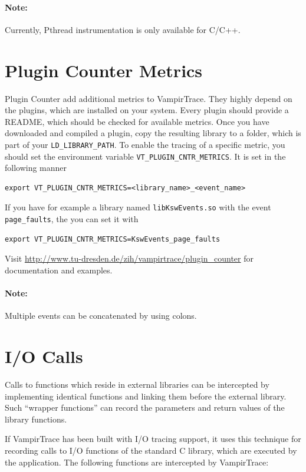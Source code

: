 \documentclass[a4paper,twoside,12pt,BCOR12mm]{scrbook}
\begin{document}
\paragraph{Note:} Currently, Pthread instrumentation is only available for C/C++.

\section{Plugin Counter Metrics}
\label{sec:plugin_counter_metrics}
  Plugin Counter add additional metrics to VampirTrace. They highly depend on
  the plugins, which are installed on your system. Every plugin should provide a
  README, which should be checked for available metrics.
  Once you have downloaded and compiled a plugin, copy the resulting library to
  a folder, which is part of your \texttt{LD\_LIBRARY\_PATH}.
  To enable the tracing of a specific metric, you should set the environment
  variable \texttt{VT\_PLUGIN\_CNTR\_METRICS}. It is set in the following manner
\begin{verbatim}
export VT_PLUGIN_CNTR_METRICS=<library_name>_<event_name>
\end{verbatim}
  If you have for example a library named \texttt{libKswEvents.so} with the
  event \texttt{page\_faults}, the you can set it with
\begin{verbatim}
export VT_PLUGIN_CNTR_METRICS=KswEvents_page_faults
\end{verbatim}
 Visit \url{http://www.tu-dresden.de/zih/vampirtrace/plugin_counter} for
 documentation and examples.
\paragraph{Note:} Multiple events can be concatenated by using colons.

\section{I/O Calls}
\label{sec:io_calls}

  Calls to functions which reside in external libraries can be intercepted by
  implementing identical functions and linking them before the external library.
  Such ``wrapper functions'' can record the parameters and return values of the
  library functions.

  If VampirTrace has been built with I/O tracing support, it uses this technique
  for recording calls to I/O functions of the standard C library, which are
  executed by the application. The following functions
  are intercepted by VampirTrace:
\end{document}

